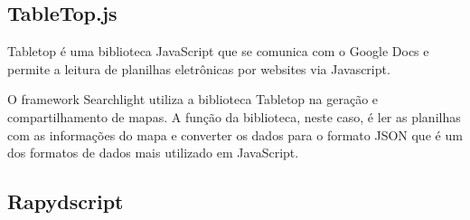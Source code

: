   \begin{table}
  \caption{\label{tabela-comparativa}Comparação entre as principais alternativas à API do Google Maps }
   
\end{table}


\subsection{TableTop.js}

Tabletop\cite{tabletop} é uma biblioteca JavaScript que se comunica com o Google Docs e permite a leitura de planilhas eletrônicas por websites via Javascript. 

O framework Searchlight utiliza a biblioteca Tabletop na geração e compartilhamento de mapas. A função da biblioteca, neste caso, é ler as planilhas com as informações do mapa e converter os dados para o formato JSON que é um dos formatos de dados mais utilizado em JavaScript.


\subsection{Rapydscript}

